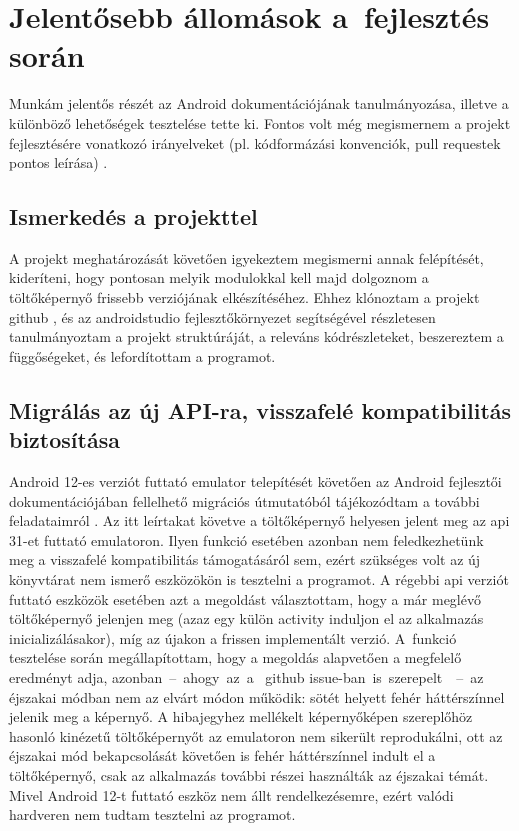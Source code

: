 \chapter{Jelentősebb állomások a~fejlesztés során}
Munkám jelentős részét az Android dokumentációjának tanulmányozása, illetve a különböző lehetőségek
tesztelése tette ki. Fontos volt még megismernem a projekt fejlesztésére vonatkozó irányelveket
(pl. kódformázási konvenciók, pull requestek pontos leírása) \cite{guidelines}.

\section{Ismerkedés a projekttel}
A projekt meghatározását követően igyekeztem megismerni annak felépítését, kideríteni, hogy
pontosan melyik modulokkal kell majd dolgoznom a töltőképernyő frissebb verziójának elkészítéséhez.
Ehhez klónoztam a projekt \gls{github} , és az \gls{androidstudio} fejlesztőkörnyezet
segítségével részletesen tanulmányoztam a projekt struktúráját, a releváns kódrészleteket,
beszereztem a függőségeket, és lefordítottam a programot.

\section{Migrálás az új API-ra, visszafelé kompatibilitás biztosítása}
Android 12-es verziót futtató \gls{emulator} telepítését követően az Android fejlesztői
dokumentációjában fellelhető migrációs útmutatóból tájékozódtam a további feladataimról \cite{splashscreenmigration}.
Az itt leírtakat követve a töltőképernyő helyesen jelent meg az \acrshort{api} 31-et futtató \gls{emulator}on.
Ilyen funkció esetében azonban nem feledkezhetünk meg a visszafelé kompatibilitás támogatásáról
sem, ezért szükséges volt az új könyvtárat nem ismerő eszközökön is tesztelni a programot.
A régebbi \acrshort{api} verziót futtató eszközök esetében azt a megoldást választottam, hogy a már meglévő
töltőképernyő jelenjen meg (azaz egy külön  \gls{activity} induljon el az alkalmazás
inicializálásakor), míg az újakon a frissen implementált verzió. A~funkció tesztelése során
megállapítottam, hogy a megoldás alapvetően a megfelelő eredményt adja, azonban~--~ahogy~az~a~
\gls{github} issue-ban~is~\mbox{szerepelt}~\cite{issue}~--~az éjszakai módban nem az elvárt módon működik: sötét helyett
fehér háttérszínnel jelenik meg a képernyő. A hibajegyhez mellékelt képernyőképen szereplőhöz
hasonló kinézetű töltőképernyőt az \gls{emulator}on nem sikerült reprodukálni, ott az éjszakai mód
bekapcsolását követően is fehér háttérszínnel indult el a töltőképernyő, csak az alkalmazás
további részei használták az éjszakai témát. Mivel Android 12-t futtató eszköz nem állt
rendelkezésemre, ezért valódi hardveren nem tudtam tesztelni az programot.

